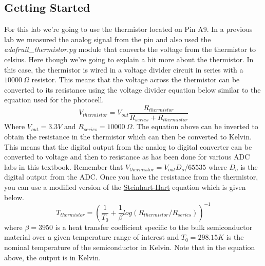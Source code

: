 \subsection{Getting Started}
For this lab we're going to use the thermistor located on Pin A9. In a previous lab we measured the analog signal from the pin and also used the {\it adafruit\_thermistor.py} module that converts the voltage from the thermistor to celsius. Here though we're going to explain a bit more about the thermistor. In this case, the thermistor is wired in a voltage divider circuit in series with a $10000~\Omega$ resistor. This means that the voltage across the thermistor can be converted to its resistance using the voltage divider equation below similar to the equation used for the photocell.
\begin{equation}
V_{thermistor} = V_{out}\frac{R_{thermistor}}{R_{series}+R_{thermistor}}
\end{equation}
Where $V_{out}=3.3V$ and $R_{series}=10000~\Omega$. The equation above can be inverted to obtain the resistance in the thermistor which can then be converted to Kelvin. This means that the digital output from the analog to digital converter can be converted to voltage and then to resistance as has been done for various ADC labs in this textbook. Remember that $V_{thermistor} = V_{out}D_o/65535$ where $D_o$ is the digital output from the ADC. Once you have the resistance from the thermistor, you can use a modified version of the \href{https://en.wikipedia.org/wiki/Steinhart%E2%80%93Hart_equation}{Steinhart-Hart} equation which is given below.
\begin{equation}
T_{thermistor}=\left(\frac{1}{T_0}+\frac{1}{\beta}log(R_{thermistor}/R_{series})\right)^{-1}
\end{equation}
where $\beta=3950$ is a heat transfer coefficient specific to the bulk semiconductor material over a given temperature range of interest and $T_0=298.15K$ is the nominal temperature of the semiconductor in Kelvin. Note that in the equation above, the output is in Kelvin.

